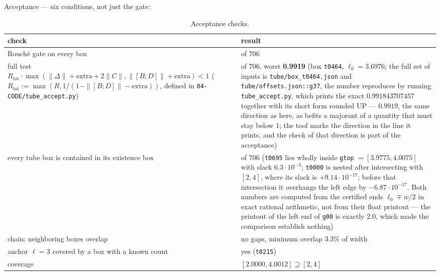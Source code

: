 Acceptance --- six conditions, not just the gate:

\begin{table}[h]
\centering
\caption{Acceptance checks.}\label{tab:acceptance}
{\small\setlength{\tabcolsep}{4pt}
\begin{tabular}{>{\raggedright\arraybackslash}p{}>{\raggedright\arraybackslash}p{}}
\toprule
check & result \\
\midrule
Rouché gate on every box & 706 of 706 \\
full test $R_{\mathrm{tot}}\cdot \max(\|\Delta\| + \mathrm{extra} + 2\|C\|, \|[B;D]\| + \mathrm{extra}) < 1$ ($R_{\mathrm{tot}} := \max(R, 1/(1-\|[B;D]\|-\mathrm{extra}))$, defined in \texttt{04-\allowbreak CODE/\allowbreak tube\_\allowbreak accept.py}) & 706 of 706, worst \textbf{0.9919} (box \texttt{t0464}, $\ell_{0} = 3.6976$; the full set of inputs is \texttt{tube/\allowbreak box\_\allowbreak t0464.json} and \texttt{tube/\allowbreak offsets.json::\allowbreak g37}, the number reproduces by running \texttt{tube\_\allowbreak accept.py}, which prints the exact $0.991843707457$ together with its short form rounded UP --- $0.9919$, the same direction as here, as befits a majorant of a quantity that must stay below $1$; the tool marks the direction in the line it prints, and the check of that direction is part of the acceptance) \\
every tube box is contained in its existence box & 706 of 706 (\texttt{t0695} lies wholly inside \texttt{gtop} $= [3.9775, 4.0075]$ with slack $6.3\cdot 10^{-3}$; \texttt{t0000} is nested after intersecting with $[2,4]$, where its slack is $+9.14\cdot 10^{-17}$; before that intersection it overhangs the left edge by $-6.87\cdot 10^{-17}$. Both numbers are computed from the certified ends $\ell_0 \mp w/2$ in exact rational arithmetic, not from their float printout --- the printout of the left end of \texttt{g00} is exactly $2.0$, which made the comparison establish nothing) \\
chain: neighboring boxes overlap & no gaps, minimum overlap 3.3\% of width \\
anchor $\ell=3$ covered by a box with a known count & yes (\texttt{t0215}) \\
coverage & $[2.0000, 4.0012] \supseteq [2,4]$ \\
\bottomrule
\end{tabular}}
\end{table}
\FloatBarrier

